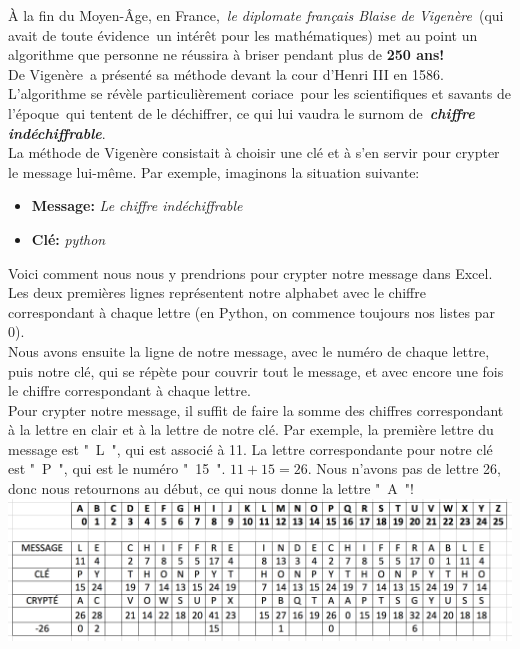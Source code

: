 \documentclass{article}
\begin{document}
À la fin du Moyen-Âge, en France, \textit{le diplomate français Blaise de Vigenère} (qui avait de toute évidence un intérêt pour les mathématiques) met au point un algorithme que personne ne réussira à briser pendant plus de \textbf{250 ans!}\\

De Vigenère a présenté sa méthode devant la cour d’Henri III en 1586. L’algorithme se révèle particulièrement coriace pour les scientifiques et savants de l’époque qui tentent de le déchiffrer, ce qui lui vaudra le surnom de \textit{\textbf{chiffre indéchiffrable}}.\\

La méthode de Vigenère consistait à choisir une clé et à s’en servir pour crypter le message lui-même. Par exemple, imaginons la situation suivante:
\begin{itemize}[label=\textbullet, font=\LARGE \color{black}]
\item \textbf{Message:} \textit{Le chiffre indéchiffrable}
\item \textbf{Clé:} \textit{python}
\end{itemize}
$$ $$
Voici comment nous nous y prendrions pour crypter notre message dans Excel. Les deux premières lignes représentent notre alphabet avec le chiffre correspondant à chaque lettre (en Python, on commence toujours nos listes par 0).\\

Nous avons ensuite la ligne de notre message, avec le numéro de chaque lettre, puis notre clé, qui se répète pour couvrir tout le message, et avec encore une fois le chiffre correspondant à chaque lettre.\\

Pour crypter notre message, il suffit de faire la somme des chiffres correspondant à la lettre en clair et à la lettre de notre clé. Par exemple, la première lettre du message est " L ", qui est associé à 11. La lettre correspondante pour notre clé est " P ", qui est le numéro " 15 ". $11 + 15 = 26$. Nous n’avons pas de lettre 26, donc nous retournons au début, ce qui nous donne la lettre " A "!\\


\includegraphics[width=15cm]{t.png}\\
\end{document}
